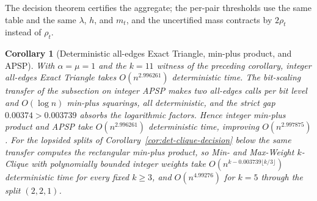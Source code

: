 \documentclass[11pt]{article}
\newtheorem{corollary}[theorem]{Corollary}
\begin{document}
The decision theorem certifies the aggregate; the per-pair thresholds use
the same table and the same $\lambda$, $h$, and $m_t$, and the uncertified
mass contracts by $2\rho_t$ instead of $\rho_t$.

\begin{corollary}[Deterministic all-edges Exact Triangle, min-plus product, and APSP]
\label{cor:det-all-edges-moments}
With $\alpha=\mu=1$ and the $k=11$ witness of the preceding corollary,
integer all-edges Exact Triangle takes $O(n^{2.996261})$ deterministic
time. The bit-scaling transfer of the subsection on integer APSP makes two
all-edges calls per bit level and $O(\log n)$ min-plus squarings, all
deterministic, and the strict gap $0.00374>0.003739$ absorbs the
logarithmic factors. Hence integer min-plus product and APSP take
$O(n^{2.996261})$ deterministic time, improving $O(n^{2.997875})$. For the
lopsided splits of Corollary~\ref{cor:det-clique-decision} below the same
transfer
computes the rectangular min-plus product, so Min- and Max-Weight
$k$-Clique with polynomially bounded integer weights take
$O(n^{k-0.003739\lfloor k/3\rfloor})$ deterministic time for every fixed
$k\ge3$, and $O(n^{4.99276})$ for $k=5$ through the split $(2,2,1)$.
\end{corollary}
\end{document}
